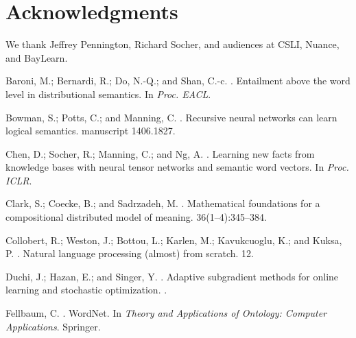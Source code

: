 \documentclass[letterpaper]{article}
\begin{document}
\section{Acknowledgments}

We thank Jeffrey Pennington, Richard Socher, and audiences at CSLI, Nuance, and BayLearn.


\begin{thebibliography}{}

Baroni, M.; Bernardi, R.; Do, N.-Q.; and Shan, C.-c.
.
\newblock Entailment above the word level in distributional semantics.
\newblock In {\em Proc. EACL}.

Bowman, S.; Potts, C.; and Manning, C.
.
\newblock Recursive neural networks can learn logical semantics.
 manuscript 1406.1827.

Chen, D.; Socher, R.; Manning, C.; and Ng, A.
.
\newblock Learning new facts from knowledge bases with neural tensor networks
  and semantic word vectors.
\newblock In {\em Proc. {ICLR}}.

Clark, S.; Coecke, B.; and Sadrzadeh, M.
.
\newblock Mathematical foundations for a compositional distributed model of
  meaning.
 36(1--4):345--384.

Collobert, R.; Weston, J.; Bottou, L.; Karlen, M.; Kavukcuoglu, K.; and Kuksa,
  P.
.
\newblock Natural language processing (almost) from scratch.
 12.

Duchi, J.; Hazan, E.; and Singer, Y.
.
\newblock Adaptive subgradient methods for online learning and stochastic
  optimization.
.

Fellbaum, C.
.
\newblock Word{N}et.
\newblock In {\em Theory and Applications of Ontology: Computer Applications}.
  Springer.


\end{thebibliography}
\end{document}
